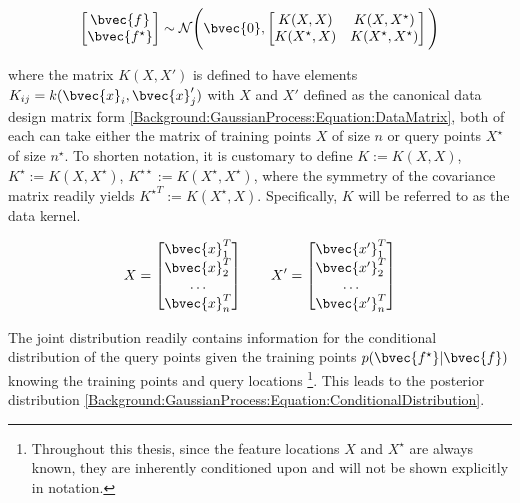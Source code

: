 		\begin{equation}
			\begin{bmatrix}
				\bvec{f^{ }} \\ \bvec{f^{\star}}
			\end{bmatrix}
			\sim \mathcal{N}\Bigg(\bvec{0}, \begin{bmatrix}
												K(X, X) & K(X, X^{\star}) \\
												K(X^{\star}, X) & K(X^{\star}, X^{\star}) \\
											\end{bmatrix}  \Bigg)
		\label{Background:GaussianProcess:Equation:Distribution}
		\end{equation}
		
		where the matrix $K(X, X')$ is defined to have elements $K_{ij} = k(\bvec{x}_{i}, \bvec{x}'_{j})$ with $X$ and $X'$ defined as the canonical data design matrix form \eqref{Background:GaussianProcess:Equation:DataMatrix}, both of each can take either the matrix of training points $X$ of size $n$ or query points $X^{\star}$ of size $n^{\star}$. To shorten notation, it is customary to define $K := K(X, X)$, $K^{\star} := K(X, X^{\star})$, $K^{\star \star} := K(X^{\star}, X^{\star})$, where the symmetry of the covariance matrix readily yields ${K^{\star}}^{T} := K(X^{\star}, X)$. Specifically, $K$ will be referred to as the data kernel.
		
		\begin{equation}
			X = \begin{bmatrix}
				\bvec{x}_{1}^{T} \\ \bvec{x}_{2}^{T} \\ \dots \\ \bvec{x}_{n}^{T}
			\end{bmatrix} \qquad X' = \begin{bmatrix}
								\bvec{x'}_{1}^{T} \\ \bvec{x'}_{2}^{T} \\ \dots \\ \bvec{x'}_{n}^{T}
							\end{bmatrix}
		\label{Background:GaussianProcess:Equation:DataMatrix}
		\end{equation}	
			
		The joint distribution readily contains information for the conditional distribution of the query points given the training points $p(\bvec{f^{\star}} | \bvec{f})$ knowing the training points and query locations \footnote{Throughout this thesis, since the feature locations $X$ and $X^{\star}$ are always known, they are inherently conditioned upon and will not be shown explicitly in notation.}. This leads to the posterior distribution \eqref{Background:GaussianProcess:Equation:ConditionalDistribution}.
		
